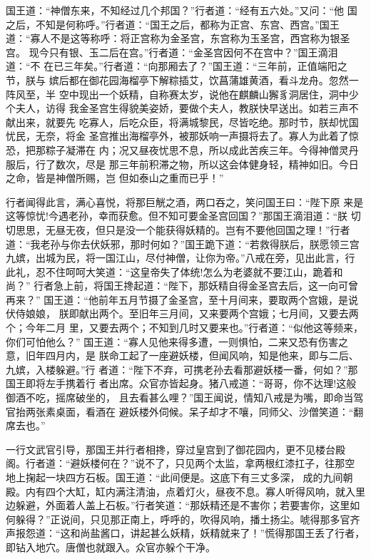 国王道：“神僧东来，不知经过几个邦国？”行者道：“经有五六处。”又问：“他
国之后，不知是何称呼。”行者道：“国王之后，都称为正宫、东宫、西宫。”国王
道：“寡人不是这等称呼：将正宫称为金圣宫，东宫称为玉圣宫，西宫称为银圣宫。
现今只有银、玉二后在宫。”行者道：“金圣宫因何不在宫中？”国王滴泪道：“不
在已三年矣。”行者道：“向那厢去了？”国王道：“三年前，正值端阳之节，朕与
嫔后都在御花园海榴亭下解粽插艾，饮菖蒲雄黄酒，看斗龙舟。忽然一阵风至，半
空中现出一个妖精，自称赛太岁，说他在麒麟山獬豸洞居住，洞中少个夫人，访得
我金圣宫生得貌美姿娇，要做个夫人，教朕快早送出。如若三声不献出来，就要先
吃寡人，后吃众臣，将满城黎民，尽皆吃绝。那时节，朕却忧国忧民，无奈，将金
圣宫推出海榴亭外，被那妖响一声摄将去了。寡人为此着了惊恐，把那粽子凝滞在
内；况又昼夜忧思不息，所以成此苦疾三年。今得神僧灵丹服后，行了数次，尽是
那三年前积滞之物，所以这会体健身轻，精神如旧。今日之命，皆是神僧所赐，岂
但如泰山之重而已乎！”

行者闻得此言，满心喜悦，将那巨觥之酒，两口吞之，笑问国王曰：“陛下原
来是这等惊忧!今遇老孙，幸而获愈。但不知可要金圣宫回国？”那国王滴泪道：“朕
切切思思，无昼无夜，但只是没一个能获得妖精的。岂有不要他回国之理！”行者
道：“我老孙与你去伏妖邪，那时何如？”国王跪下道：“若救得朕后，朕愿领三宫
九嫔，出城为民，将一国江山，尽付神僧，让你为帝。”八戒在旁，见出此言，行
此礼，忍不住呵呵大笑道：“这皇帝失了体统!怎么为老婆就不要江山，跪着和尚？”
行者急上前，将国王搀起道：“陛下，那妖精自得金圣宫去后，这一向可曾再来？”
国王道：“他前年五月节摄了金圣宫，至十月间来，要取两个宫娥，是说伏侍娘娘，
朕即献出两个。至旧年三月间，又来要两个宫娥；七月间，又要去两个；今年二月
里，又要去两个；不知到几时又要来也。”行者道：“似他这等频来，你们可怕他么？”
国王道：“寡人见他来得多遭，一则惧怕，二来又恐有伤害之意，旧年四月内，是
朕命工起了一座避妖楼，但闻风响，知是他来，即与二后、九嫔，入楼躲避。”行
者道：“陛下不弃，可携老孙去看那避妖楼一番，何如？”那国王即将左手携着行
者出席。众官亦皆起身。猪八戒道：“哥哥，你不达理!这般御酒不吃，摇席破坐的，
且去看甚么哩？”国王闻说，情知八戒是为嘴，即命当驾官抬两张素桌面，看酒在
避妖楼外伺候。呆子却才不嚷，同师父、沙僧笑道：“翻席去也。”

一行文武官引导，那国王并行者相搀，穿过皇宫到了御花园内，更不见楼台殿
阁。行者道：“避妖楼何在？”说不了，只见两个太监，拿两根红漆扛子，往那空
地上掬起一块四方石板。国王道：“此间便是。这底下有三丈多深，成的九间朝
殿。内有四个大缸，缸内满注清油，点着灯火，昼夜不息。寡人听得风响，就入里
边躲避，外面着人盖上石板。”行者笑道：“那妖精还是不害你；若要害你，这里如
何躲得？”正说间，只见那正南上，呼呼的，吹得风响，播土扬尘。唬得那多官齐
声报怨道：“这和尚盐酱口，讲起甚么妖精，妖精就来了！”慌得那国王丢了行者，
即钻入地穴。唐僧也就跟入。众官亦躲个干净。

